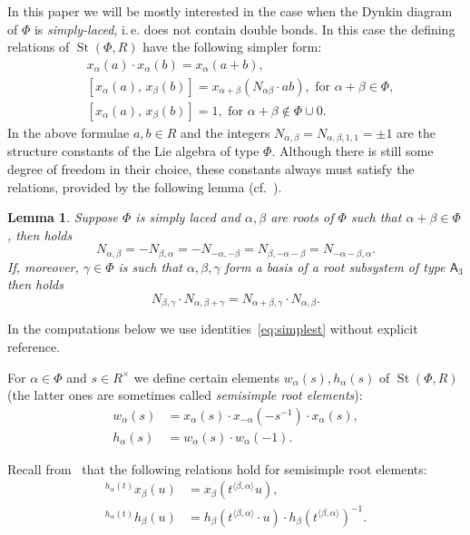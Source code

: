 \documentclass[oneside, 8pt]{amsart}
\newtheorem{lemma}{Lemma}
\theoremstyle{remark}
\theoremstyle{definition}
\numberwithin{lemma}{section}
\numberwithin{prop}{section}
\numberwithin{corollary}{section}
\DeclareMathOperator{\St}{St}
\newcommand{\rA}{\mathsf{A}}
\numberwithin{equation}{section}
\begin{document}
In this paper we will be mostly interested in the case when the Dynkin diagram of $\Phi$ is {\it simply-laced}, i.\,e. does not contain double bonds. In this case the defining relations of $\St(\Phi, R)$ have the following simpler form:
\begin{align}
&x_{\alpha}(a)\cdot x_{\alpha}(b)=x_{\alpha}(a+b), \tag{R1}\\
&[x_{\alpha}(a),\,x_{\beta}(b)]=x_{\alpha+\beta}(N_{\alpha\beta} \cdot ab),\text{ for }\alpha+\beta\in\Phi, \tag{R2} \\
&[x_{\alpha}(a),\,x_{\beta}(b)]=1,\text{ for }\alpha+\beta\not\in\Phi\cup0. \tag{R3}
\end{align}
In the above formulae $a, b \in R$ and the integers $N_{\alpha, \beta} = N_{\alpha, \beta, 1, 1} = \pm 1$ are the structure constants of the Lie algebra of type $\Phi$. Although there is still some degree of freedom in their choice, these constants always must satisfy the relations, provided by the following lemma (cf.~\cite[\S~14]{VP}).
\begin{lemma} Suppose $\Phi$ is simply laced and $\alpha, \beta$ are roots of $\Phi$ such that $\alpha+\beta\in \Phi$, then holds
\begin{equation} \label{eq:simplest} N_{\alpha, \beta} = -N_{\beta,\alpha} = - N_{-\alpha, -\beta} = N_{\beta, -\alpha-\beta} = N_{-\alpha-\beta, \alpha}. \end{equation}
If, moreover, $\gamma \in \Phi$ is such that $\alpha,\beta,\gamma$ form a basis of a root subsystem of type $\rA_3$ then holds
\begin{equation} \label{eq:cocycle} N_{\beta,\gamma} \cdot N_{\alpha, \beta+\gamma} = N_{\alpha+\beta, \gamma} \cdot N_{\alpha, \beta}. \end{equation} \end{lemma}
In the computations below we use identities~\eqref{eq:simplest} without explicit reference.

For $\alpha\in\Phi$ and $s \in R^\times$ we define certain elements $w_\alpha(s), h_\alpha(s)$ of $\St(\Phi, R)$ (the latter ones are sometimes called {\it semisimple root elements}):
\begin{align*} w_\alpha(s) & =  x_\alpha(s) \cdot x_{-\alpha}(-s^{-1}) \cdot x_\alpha(s), \\ h_\alpha(s) & =  w_\alpha(s) \cdot w_\alpha(-1).  \end{align*}

Recall from~\cite[Lemma~5.2]{Ma69} that the following relations hold for semisimple root elements:
\begin{align} \label{eq:conj-h-x} {}^{h_\alpha(t)}\!x_\beta(u) & = x_\beta(t^{\langle \beta,  \alpha \rangle}u), \\ \label{eq:conj-h-h} {}^{h_\alpha(t)}\!h_\beta(u) & = h_\beta(t^{\langle \beta, \alpha \rangle} \cdot u) \cdot h_\beta(t^{\langle \beta,  \alpha \rangle})^{-1}. \end{align}
\end{document}

